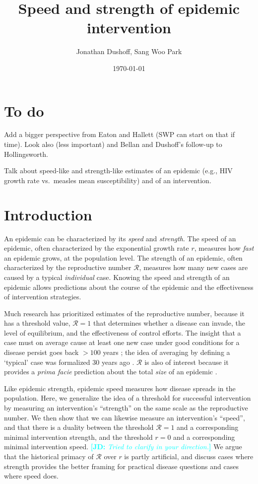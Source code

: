 \documentclass[12pt]{article}\usepackage[]{graphicx}\usepackage[]{color}
\title{Speed and strength of epidemic intervention}
\author{Jonathan Dushoff, Sang Woo Park}
\date{\today}
\newcommand{\comment}[3]{\textcolor{#1}{\textbf{[#2: }\textit{#3}\textbf{]}}}
\newcommand{\jd}[1]{\comment{cyan}{JD}{#1}}
\newcommand{\RR}{\ensuremath{{\mathcal R}}}
\begin{document}
\maketitle

\section{To do}

Add a bigger perspective from Eaton and Hallett (SWP can start on that if time). Look also (less important) and Bellan and Dushoff's follow-up to Hollingsworth.

Talk about speed-like and strength-like estimates of an epidemic (e.g., HIV growth rate vs.~measles mean susceptibility) and of an intervention.

\section{Introduction}

An epidemic can be characterized by its \emph{speed} and \emph{strength}.
The speed of an epidemic, often characterized by the exponential growth rate $r$, measures how \emph{fast} an epidemic grows, at the population level. 
The strength of an epidemic, often characterized by the reproductive number $\RR$, measures how many new cases are caused by a typical \emph{individual} case.
Knowing the speed and strength of an epidemic allows predictions about the course of the epidemic and the effectiveness of intervention strategies.

Much research has prioritized estimates of the reproductive number, because it has a threshold value, $\RR=1$ that determines whether a disease can invade, the level of equilibrium, and the effectiveness of control efforts. 
The insight that a case must on average cause at least one new case under good conditions for a disease persist goes back $>100$ years \citep{ross1911prevention};
the idea of averaging by defining a `typical' case was formalized 30 years ago \citep{diekmann1990definition}.
$\RR$ is also of interest because it provides a \emph{prima facie} prediction about the total \emph{size} of an epidemic \citep{anderson1991infectious, ma2006generality, miller2012note}. 

Like epidemic strength, epidemic speed measures how disease spreads in the population. 
Here, we generalize the idea of a threshold for successful intervention by measuring an intervention's ``strength'' on the same scale as the reproductive number. 
We then show that we can likewise measure an intervention's ``speed'', and that there is a duality between the threshold $\RR=1$ and a corresponding minimal intervention strength, and the threshold $r=0$ and a corresponding minimal intervention speed. \jd{Tried to clarify in your direction.}
We argue that the historical primacy of $\RR$ over $r$ is partly artificial, and discuss cases where strength provides the better framing for practical disease questions and cases where speed does.
\end{document}
